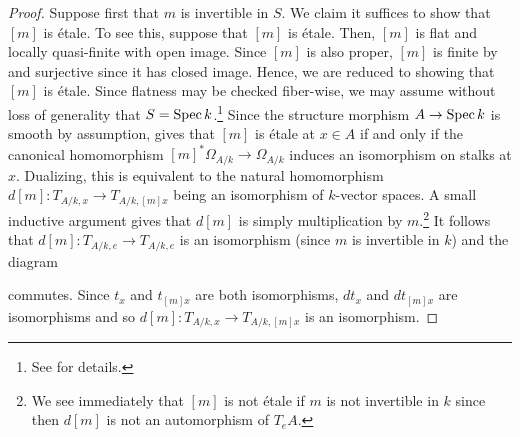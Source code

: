 \documentclass[11pt]{article}
\begin{document}
\begin{proof}
Suppose first that $m$ is invertible in $S$. We claim it suffices to show that $[m]$ is \'{e}tale. To see this, suppose that $[m]$ is \'{e}tale. Then, $[m]$ is flat and locally quasi-finite with open image. Since $[m]$ is also proper, $[m]$ is finite by \cite[\textrm{Tag 02LS}]{Stack} and surjective since it has closed image. Hence, we are reduced to showing that $[m]$ is \'{e}tale. Since flatness may be checked fiber-wise, we may assume without loss of generality that $S=\operatorname{Spec} k$.\footnote{See \cite[\textrm{Section 2.2 and 2.4}]{BLR} for details.} Since the structure morphism $A\to\operatorname{Spec} k$ is smooth by assumption, \cite[\textrm{Cor 2.2/10}]{BLR} gives that $[m]$ is \'{e}tale at $x\in A$ if and only if the canonical homomorphism $[m]^*\Omega_{A/k}\to\Omega_{A/k}$ induces an isomorphism on stalks at $x$. Dualizing, this is equivalent to the natural homomorphism $d[m]: T_{A/k,x}\to T_{A/k,[m]x}$ being an isomorphism of $k$-vector spaces. A small inductive argument gives that $d[m]$ is simply multiplication by $m$.\footnote{We see immediately that $[m]$ is not \'{e}tale if $m$ is not invertible in $k$ since then $d[m]$ is not an automorphism of $T_eA$.} It follows that $d[m]: T_{A/k,e}\to T_{A/k,e}$ is an isomorphism (since $m$ is invertible in $k$) and the diagram 
\begin{center}
\end{center}
commutes. Since $t_x$ and $t_{[m]x}$ are both isomorphisms, $dt_x$ and $dt_{[m]x}$ are isomorphisms and so $d[m]: T_{A/k,x}\to T_{A/k,[m]x}$ is an isomorphism.


\end{proof}
\end{document}
